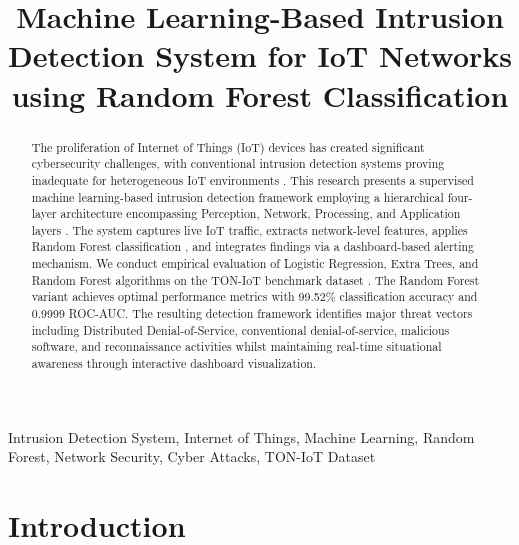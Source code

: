 \documentclass[conference]{IEEEtran}
\begin{document}
\title{Machine Learning-Based Intrusion Detection System for IoT Networks using Random Forest Classification}

\author{
}

\maketitle

\begin{abstract}
The proliferation of Internet of Things (IoT) devices has created significant cybersecurity challenges, with conventional intrusion detection systems proving inadequate for heterogeneous IoT environments \cite{b20}. This research presents a supervised machine learning-based intrusion detection framework employing a hierarchical four-layer architecture encompassing Perception, Network, Processing, and Application layers \cite{b1}. The system captures live IoT traffic, extracts network-level features, applies Random Forest classification \cite{b21}, and integrates findings via a dashboard-based alerting mechanism. We conduct empirical evaluation of Logistic Regression, Extra Trees, and Random Forest algorithms on the TON-IoT benchmark dataset \cite{b19}. The Random Forest variant achieves optimal performance metrics with 99.52\% classification accuracy and 0.9999 ROC-AUC. The resulting detection framework identifies major threat vectors including Distributed Denial-of-Service, conventional denial-of-service, malicious software, and reconnaissance activities whilst maintaining real-time situational awareness through interactive dashboard visualization.
\end{abstract}

\begin{IEEEkeywords}
Intrusion Detection System, Internet of Things, Machine Learning, Random Forest, Network Security, Cyber Attacks, TON-IoT Dataset
\end{IEEEkeywords}

\section{Introduction}
\end{document}
